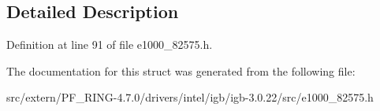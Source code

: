\subsection{Detailed Description}


Definition at line 91 of file e1000\_\-82575.h.



The documentation for this struct was generated from the following file:\begin{DoxyCompactItemize}
\item 
src/extern/PF\_\-RING-\/4.7.0/drivers/intel/igb/igb-\/3.0.22/src/e1000\_\-82575.h\end{DoxyCompactItemize}
